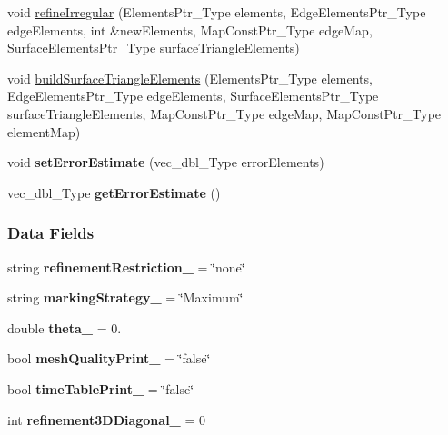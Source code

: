 \begin{DoxyCompactItemize}
\item 
void \hyperlink{classFEDD_1_1RefinementFactory_adf15bebdf004e62ff59a4753dc1fa89b}{refine\+Irregular} (Elements\+Ptr\+\_\+\+Type elements, Edge\+Elements\+Ptr\+\_\+\+Type edge\+Elements, int \&new\+Elements, Map\+Const\+Ptr\+\_\+\+Type edge\+Map, Surface\+Elements\+Ptr\+\_\+\+Type surface\+Triangle\+Elements)
\item 
void \hyperlink{classFEDD_1_1RefinementFactory_a42faaf05d60e9438f6d3ffc9e8731fff}{build\+Surface\+Triangle\+Elements} (Elements\+Ptr\+\_\+\+Type elements, Edge\+Elements\+Ptr\+\_\+\+Type edge\+Elements, Surface\+Elements\+Ptr\+\_\+\+Type surface\+Triangle\+Elements, Map\+Const\+Ptr\+\_\+\+Type edge\+Map, Map\+Const\+Ptr\+\_\+\+Type element\+Map)
\item 
\mbox{\label{classFEDD_1_1RefinementFactory_a43778220c3a80a2e2a69b27aca372d4c}} 
void {\bfseries set\+Error\+Estimate} (vec\+\_\+dbl\+\_\+\+Type error\+Elements)
\item 
\mbox{\label{classFEDD_1_1RefinementFactory_a13006996d92dd964037bbac7768702f4}} 
vec\+\_\+dbl\+\_\+\+Type {\bfseries get\+Error\+Estimate} ()
\end{DoxyCompactItemize}
\subsubsection*{Data Fields}
\begin{DoxyCompactItemize}
\item 
\mbox{\label{classFEDD_1_1RefinementFactory_a2f628fe0b946dc70f36bd7295a8211db}} 
string {\bfseries refinement\+Restriction\+\_\+} = \char`\"{}none\char`\"{}
\item 
\mbox{\label{classFEDD_1_1RefinementFactory_abc05afe32a57a439f0abe9938c467e78}} 
string {\bfseries marking\+Strategy\+\_\+} = \char`\"{}Maximum\char`\"{}
\item 
\mbox{\label{classFEDD_1_1RefinementFactory_a7c7abbd8213424c9fdf9fd9d39fc8e67}} 
double {\bfseries theta\+\_\+} = 0.
\item 
\mbox{\label{classFEDD_1_1RefinementFactory_ac154f51ad3788ae2527bf44a421a4834}} 
bool {\bfseries mesh\+Quality\+Print\+\_\+} = \char`\"{}false\char`\"{}
\item 
\mbox{\label{classFEDD_1_1RefinementFactory_a2f6f3b61263c544d860ff5086cd04f0c}} 
bool {\bfseries time\+Table\+Print\+\_\+} = \char`\"{}false\char`\"{}
\item 
\mbox{\label{classFEDD_1_1RefinementFactory_af36738c6f988a6d564281b04e4e739f1}} 
int {\bfseries refinement3\+D\+Diagonal\+\_\+} = 0
\end{DoxyCompactItemize}
